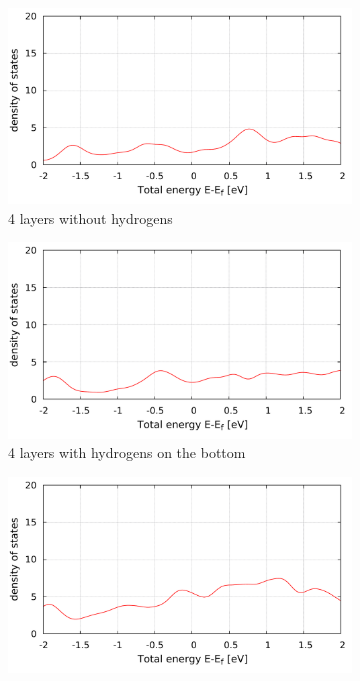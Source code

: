 	\begin{figure}[tbp]
		\begin{subfigure}[c]{.48\linewidth}
			\centering
			\includegraphics[width=\linewidth]{Te_and_Hg_termination/no_H_DOS_4_layers_-2_2.pdf}
			\caption{4 layers without hydrogens}
		\end{subfigure}
		\hfill
		\begin{subfigure}[c]{.48\linewidth}
			\centering
			\includegraphics[width=\linewidth]{Te_and_Hg_termination/DOS_4_layers_-2_2.pdf}
			\caption{4 layers with hydrogens on the bottom}
		\end{subfigure}
		\begin{subfigure}[c]{.48\linewidth}
			\centering
			\includegraphics[width=\linewidth]{Te_and_Hg_termination/no_H_DOS_8_layers_-2_2.pdf}

\end{subfigure}
\end{figure}
